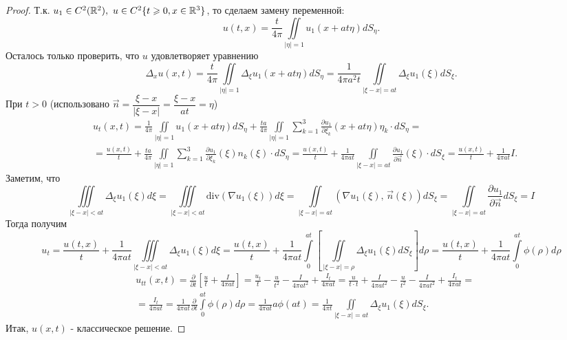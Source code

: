 \documentclass[../main.tex]{subfiles}
\begin{document}
\begin{proof}
Т.к. $u_1\in C^2(\R^2),\ u\in C^2\{t\geq 0, x\in\R^3\}$, то сделаем замену переменной:
\[
u(t, x)=\frac{t}{4\pi}\iint\limits_{|\eta |=1}u_1(x+at\eta )dS_{\eta}.
\]
Осталось только проверить, что $u$ удовлетворяет уравнению
\[
\Delta_xu(x, t)=\frac{t}{4\pi}\iint\limits_{|\eta |=1}\Delta_{\xi}u_1(x+at\eta )dS_{\eta}=\frac{1}{4\pi a^2t}\iint\limits_{|\xi - x|=at}\Delta_{\xi}u_1(\xi )dS_{\xi}.
\]
При $t>0$ (использовано $\vec{n}=\dfrac{\xi - x}{|\xi - x|}=\dfrac{\xi - x}{at}=\eta$)
\begin{equation*}
\begin{split}
&u_t(x,t)=\frac{1}{4\pi}\iint\limits_{|\eta |=1}u_1(x+at\eta )dS_{\eta}+\frac{ta}{4\pi}\iint\limits_{|\eta |=1}\sum\limits_{k=1}^3 \frac{\partial u_1}{\partial \xi_k}(x+at\eta )\eta_k\cdot dS_{\eta}=\\
&=\frac{u(x, t)}{t}+\frac{ta}{4\pi}\iint\limits_{|\eta |=1}\sum\limits_{k=1}^3 \frac{\partial u_1}{\partial \xi_k}(\xi )n_k(\xi )\cdot dS_{\eta}=\frac{u(x, t)}{t}+\frac{1}{4\pi at}\iint\limits_{|\xi - x |=at}\frac{\partial u_1}{\partial \vec{n}}(\xi )\cdot dS_{\xi}=\frac{u(x, t)}{t} + \frac{1}{4\pi at}I.
\end{split}
\end{equation*}
Заметим, что
\[
\iiint\limits_{|\xi - x|<at}\Delta_{\xi}u_1(\xi )d\xi =\iiint\limits_{|\xi - x|<at}\mathrm{div} (\nabla u_1(\xi ))d\xi =\iint\limits_{|\xi - x|=at}\left(\nabla u_1(\xi ),\, \vec{n}(\xi )\right)dS_{\xi }=\iint\limits_{|\xi - x|=at}\frac{\partial u_1}{\partial\vec{n}}dS_{\xi }=I
\]
Тогда получим 
\[
u_t=\frac{u(t, x)}{t}+\frac{1}{4\pi at}\iiint\limits_{|\xi - x|<at}\Delta_{\xi}u_1(\xi )d\xi = \frac{u(t, x)}{t}+\frac{1}{4\pi at}\int\limits_0^{at}\left[\iint\limits_{|\xi - x|=\rho}\Delta_{\xi}u_1(\xi )dS_{\xi}\right]d\rho=\frac{u(t, x)}{t}+\frac{1}{4\pi at}\int\limits_0^{at}\phi (\rho )d\rho
\]
\begin{equation*}
\begin{split}
&u_{tt}(x, t)=\frac{\partial}{\partial t}\left[\frac{u}{t}+\frac{I}{4\pi at} \right]=\frac{u_t}{t}-\frac{u}{t^2}-\frac{I}{4\pi at^2}+\frac{I_t}{4\pi at}=\frac{u}{t\cdot t}+\frac{I}{4\pi at^2}-\frac{u}{t^2}-\frac{I}{4\pi at^2}+\frac{I_t}{4\pi at}=\\
&=\frac{I_t}{4\pi at}=\frac{1}{4\pi at}\frac{\partial}{\partial t}\int\limits_0^{at}\phi (\rho )d\rho = \frac{1}{4\pi at}a\phi(at)=\frac{1}{4\pi t}\iint\limits_{|\xi - x|=at}\Delta_{\xi}u_1(\xi )dS_{\xi}.
\end{split}
\end{equation*}
Итак, $u(x, t)$ - классическое решение.
\end{proof}
\end{document}
